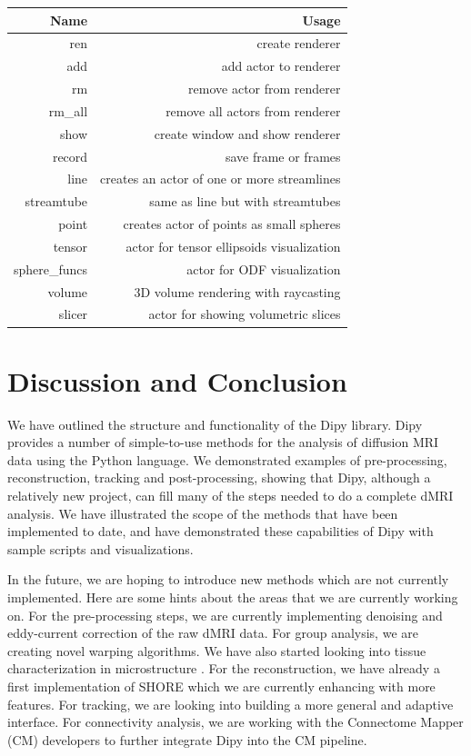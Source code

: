 \documentclass{bioinfo}
\begin{document}
\begin{table}[th] 
{\begin{tabular}{rr} \hline
Name & Usage \\ \hline
ren & create renderer\\
add & add actor to renderer\\
rm  & remove actor from renderer \\
rm\_all & remove all actors from renderer \\
show & create window and show renderer \\
record & save frame or frames \\
line & creates an actor of one or more streamlines \\
streamtube & same as line but with streamtubes \\
point & creates actor of points as small spheres \\
tensor & actor for tensor ellipsoids visualization\\
sphere\_funcs & actor for ODF visualization \\
volume & 3D volume rendering with raycasting \\
slicer & actor for showing volumetric slices \\
\hline
\end{tabular}}{}
\end{table}

\section{Discussion and Conclusion}

We have outlined the structure and functionality of the Dipy library.  Dipy
provides a number of simple-to-use methods for the analysis of diffusion MRI data using the Python
language. We demonstrated examples of pre-processing, reconstruction, tracking and post-processing,
showing that Dipy, although a relatively new project, can fill many of the steps needed to do a complete
dMRI analysis. We have illustrated the scope of the methods that have been implemented to date, and have
demonstrated these capabilities of Dipy with sample scripts and visualizations.

In the future, we are hoping to introduce new methods which are not currently implemented. Here are some hints about the areas that we are currently working on. For the pre-processing steps, we are currently implementing denoising and eddy-current correction of the raw dMRI data. For group analysis, we are creating novel warping algorithms. We have also started looking into tissue characterization in microstructure \citep{assaf-blumenfeld-etal:08}. For the reconstruction, we have already a first implementation of SHORE \citep{ozarslan2013mean} which we are currently enhancing with more features. For tracking, we are looking into building a more general and adaptive interface. For connectivity analysis, we are working with the Connectome Mapper (CM) \citep{daducci2012connectome} developers to further integrate Dipy into the CM pipeline. 
\end{document}
